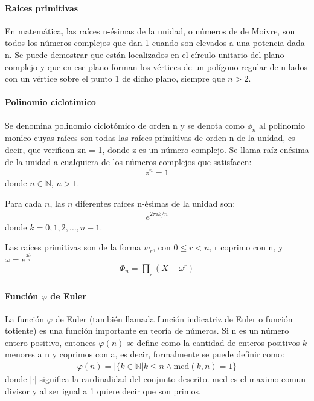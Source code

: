 \documentclass[12pt, oneside]{article}
\newcommand{\N}{\mathbb{N}}
\begin{document}
\paragraph{Raices primitivas}
En matemática, las raíces n-ésimas de la unidad, o números de de Moivre,
son todos los números complejos que dan 1 cuando son elevados a una potencia dada n.
Se puede demostrar que están localizados en el círculo unitario del plano complejo y
que en ese plano forman los vértices de un polígono regular de n lados con un vértice
sobre el punto 1 de dicho plano, siempre que $n>2$.

\paragraph{Polinomio ciclotimico}
Se denomina polinomio ciclotómico de orden n y se denota como $\phi_n$ al
polinomio monico cuyas raíces son todas las raíces primitivas de orden n de la unidad,
es decir, que verifican zn = 1, donde z es un número complejo.
Se llama raíz enésima de la unidad a cualquiera de los números complejos que
satisfacen:
\begin{align*}
  z^{n}=1
\end{align*}
donde $n\in\N$, $n>1$.

Para cada $n$, las $n$ diferentes raíces n-ésimas de la unidad son:
\begin{align*}
  e^{2\pi ik/n}
\end{align*}
 donde $k=0,1,2,\dots ,n-1$.

 Las raíces primitivas son de la forma $w_r$, con $0 \leq r < n$, r coprimo con n, y $\omega =e^{\frac {2i\pi }{n}}$
\begin{align*}
 \Phi _{n}=\prod _{{}_{r}}(X-\omega ^{r})
\end{align*}
 \paragraph{Función $\varphi$ de Euler}
 La función $\varphi$ de Euler (también llamada función indicatriz de Euler o función totiente)
 es una función importante en teoría de números.
 Si n es un número entero positivo,  entonces $\varphi(n)$ se define como la
 cantidad de enteros positivos $k$ menores a n y
 coprimos con a, es decir, formalmente se puede definir como:
 \begin{align*}
 \varphi(n)=|\{k\in \mathbb {N} |k\leq n\land \mathrm {mcd} (k,n)=1\}
 \end{align*}
 donde $|·|$ significa la cardinalidad del conjunto descrito.
 mcd es el maximo comun divisor y al ser igual a 1 quiere decir que son primos.
\end{document}
